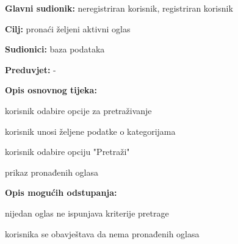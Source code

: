 					\noindent {}
					\begin{packed_item}
						
						\item \textbf{Glavni sudionik: } neregistriran korisnik, registriran korisnik
						\item  \textbf{Cilj:} pronaći željeni aktivni oglas
						\item  \textbf{Sudionici:} baza podataka
						\item  \textbf{Preduvjet:} -
						\item  \textbf{Opis osnovnog tijeka:}
						
						\item[] \begin{packed_enum}
							
							\item korisnik odabire opcije za pretraživanje
							\item korisnik unosi željene podatke o kategorijama
							\item korisnik odabire opciju "Pretraži"
							\item prikaz pronađenih oglasa
						\end{packed_enum}
						
						\item  \textbf{Opis mogućih odstupanja:}
						
						\item[] \begin{packed_item}
							
							\item[3.a] nijedan oglas ne ispunjava kriterije pretrage
							\item[] \begin{packed_enum}
								\item korisnika se obavještava da nema pronađenih oglasa
							\end{packed_enum}
							
						\end{packed_item}
					\end{packed_item}
					
